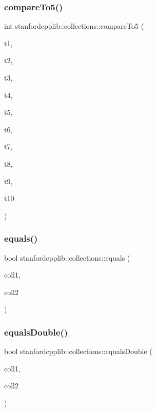 \subsubsection{\texorpdfstring{compare\+To5()}{compareTo5()}}
{\footnotesize\ttfamily int stanfordcpplib\+::collections\+::compare\+To5 (\begin{DoxyParamCaption}\item[{T1}]{t1,  }\item[{T1}]{t2,  }\item[{T2}]{t3,  }\item[{T2}]{t4,  }\item[{T3}]{t5,  }\item[{T3}]{t6,  }\item[{T4}]{t7,  }\item[{T4}]{t8,  }\item[{T5}]{t9,  }\item[{T5}]{t10 }\end{DoxyParamCaption})}

\mbox{\label{namespacestanfordcpplib_1_1collections_a7ffc19787c4a86528a81d8a7b2d6d963}} 
\subsubsection{\texorpdfstring{equals()}{equals()}}
{\footnotesize\ttfamily bool stanfordcpplib\+::collections\+::equals (\begin{DoxyParamCaption}\item[{const Collection\+Type \&}]{coll1,  }\item[{const Collection\+Type \&}]{coll2 }\end{DoxyParamCaption})}

\mbox{\label{namespacestanfordcpplib_1_1collections_ae626c392f1fc8926386ed9e5c232524c}} 
\subsubsection{\texorpdfstring{equals\+Double()}{equalsDouble()}}
{\footnotesize\ttfamily bool stanfordcpplib\+::collections\+::equals\+Double (\begin{DoxyParamCaption}\item[{const Collection\+Type \&}]{coll1,  }\item[{const Collection\+Type \&}]{coll2 }\end{DoxyParamCaption})}

